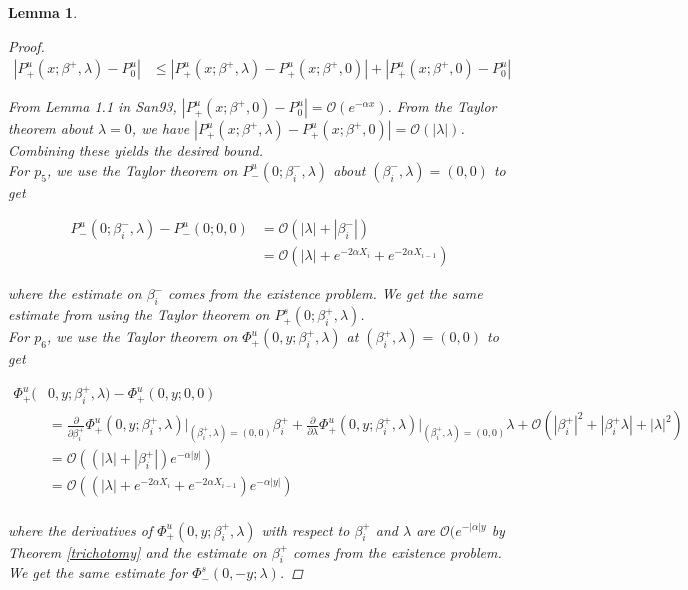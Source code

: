 \documentclass[12pt]{article}
\newtheorem{lemma}{Lemma}
\begin{document}
\begin{lemma}
\begin{proof}
\begin{align*}
|P^u_+(x; \beta^+, \lambda) - P_0^u| 
&\leq |P^u_+(x; \beta^+, \lambda) - P^u_+(x; \beta^+, 0)| + |P^u_+(x; \beta^+, 0) - P_0^u| 
\end{align*}

From Lemma 1.1 in San93, $|P^u_+(x; \beta^+, 0) - P_0^u| = \mathcal{O}(e^{-\alpha x})$. From the Taylor theorem about $\lambda = 0$, we have $|P^u_+(x; \beta^+, \lambda) - P^u_+(x; \beta^+, 0)| = \mathcal{O}(|\lambda|)$. Combining these yields the desired bound.\\

For $p_5$, we use the Taylor theorem on $P^u_-(0; \beta_i^-, \lambda)$ about $(\beta_i^-, \lambda) = (0, 0)$ to get 

\begin{align*}
P^u_-(0; \beta_i^-, \lambda) - P^u_-(0; 0, 0) &= \mathcal{O}(|\lambda| + |\beta_i^-|) \\
&= \mathcal{O}(|\lambda| + e^{-2 \alpha X_i} + e^{-2 \alpha X_{i-1}})
\end{align*}

where the estimate on $\beta_i^-$ comes from the existence problem. We get the same estimate from using the Taylor theorem on $P^s_+(0; \beta_i^+, \lambda)$.\\

For $p_6$, we use the Taylor theorem on $\Phi^u_+(0, y; \beta_i^+, \lambda)$ at $(\beta_i^+, \lambda) = (0, 0)$ to get 

\begin{align*}
\Phi^u_+(&0, y; \beta_i^+, \lambda) - \Phi^u_+(0, y; 0, 0) \\
&= \frac{\partial}{\partial \beta_i^+}\Phi^u_+(0, y; \beta_i^+, \lambda)\Big|_{(\beta_i^+, \lambda) = (0, 0)} \beta_i^+ + \frac{\partial}{\partial \lambda}\Phi^u_+(0, y; \beta_i^+, \lambda)\Big|_{(\beta_i^+, \lambda) = (0, 0)} \lambda + \mathcal{O}(|\beta_i^+|^2 + |\beta_i^+ \lambda| + |\lambda|^2) \\
&= \mathcal{O}((|\lambda| + |\beta_i^+|)e^{-\alpha |y| }) \\
&= \mathcal{O}((|\lambda| + e^{-2 \alpha X_i} + e^{-2 \alpha X_{i-1}})e^{-\alpha |y| }) \\
\end{align*}

where the derivatives of $\Phi^u_+(0, y; \beta_i^+, \lambda)$ with respect to $\beta_i^+$ and $\lambda$ are $\mathcal{O}(e^{-|\alpha|y}$ by Theorem \ref{trichotomy} and the estimate on $\beta_i^+$ comes from the existence problem. We get the same estimate for $\Phi^s_-(0, -y; \lambda)$.

\end{proof}
\end{lemma}
\end{document}
